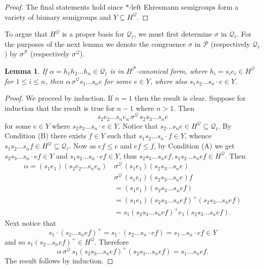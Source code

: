 \documentclass[12pt]{amsart}
\newtheorem{lem}[them]{Lemma}
\theoremstyle{definition}
\theoremstyle{definition}
\numberwithin{them}{section}
\numberwithin{equation}{section}
\newcommand{\QQ}{\mbox{$\mathcal{Q}_\ell$}}
\begin{document}
{{\begin{proof}
The final statements hold since  $*$-left Ehresmann semigroups form a variety of biunary semigroups and $Y\subseteq H^{\mathcal{Q}}$.
\end{proof}


 To argue    that $H^{\mathcal{Q}}$ is a proper basis for $\QQ$, we must first determine $\sigma$ in $\QQ$.  For the purposes of the next lemma we denote the congruence 
    $\sigma$ in $\mathcal{P}$ (respectively $\QQ$) by
    $\sigma^{\mathcal{P}}$ (respectively $\sigma^{\mathcal{Q}}$). 

    
\begin{lem}\label{aSigmac(a)e}
If $\alpha = h_1h_2\dots h_n\in \QQ$ is in $H^{\mathcal{P}}$-canonical form, where
$h_i=s_ie_i\in H^{\mathcal{Q}} $ for $1\leq i \leq n$, then 
$\alpha\, \sigma^{\mathcal{Q}}s_1\dots s_ne$ for some $e \in Y$, where also $s_1s_2\dots s_n \cdot e \in Y$.
\end{lem}
\begin{proof} We proceed by induction. If $n=1$ then the result is clear. Suppose for induction that the result is true for $n-1$ where $n >1$. Then \[s_2e_2\dots s_ne_n\, \sigma^{\mathcal{Q}} \, s_2s_3\dots s_n e\] for some $e \in Y$ where $s_2s_3\dots s_n \cdot e \in Y$. Notice that
$s_2\dots s_ne\in H^{\mathcal{Q}}\subseteq \QQ$. By Condition (B) there exists $f \in Y$ such that $s_1s_2\dots s_n \cdot f \in Y$, whence
$s_1s_2\dots s_n  f\in H^{\mathcal{Q}}\subseteq \QQ$.
Now as $ef \leq e$ and $ef \leq f$, by Condition (A) we get $s_2s_3\dots s_n \cdot ef \in Y$ and $s_1s_2\dots s_n\cdot ef \in Y$, thus $s_2s_3\dots s_n ef,  s_1s_2\dots s_n ef \in H^{\mathcal{Q}}$. Then
\[
\begin{aligned}
 \alpha=(s_1e_1)(s_2e_2\dots s_ne_n)\,& \sigma^{\mathcal{Q}}\, (s_1e_1)(s_2s_3\dots s_ne)\\
&\sigma^{\mathcal{Q}}\, (s_1e_1)(s_2s_3\dots s_ne)f\\
&=(s_1e_1)(s_2s_3\dots s_nef)\\
&=(s_1e_1)(s_2s_3\dots s_nef)^+(s_2s_3\dots s_nef)\\
&=s_1(s_2s_3\dots s_nef)^+e_1(s_2s_3\dots s_nef).\end{aligned}
\]
Next notice that
\[s_1\cdot (s_2\dots s_nef)^+=
s_1\cdot (s_2\dots s_n\cdot ef)=
s_1\dots s_n\cdot ef\in Y\]
and so $s_1(s_2\dots s_nef)^+\in H^{\mathcal{Q}}$. Therefore
\[\alpha\,\sigma^{\mathcal{Q}}\,s_1(s_2s_3\dots s_nef)^+(s_2s_3\dots s_nef) =s_1\dots s_nef.\]
The result follows by induction.
\end{proof}


}}
\end{document}
